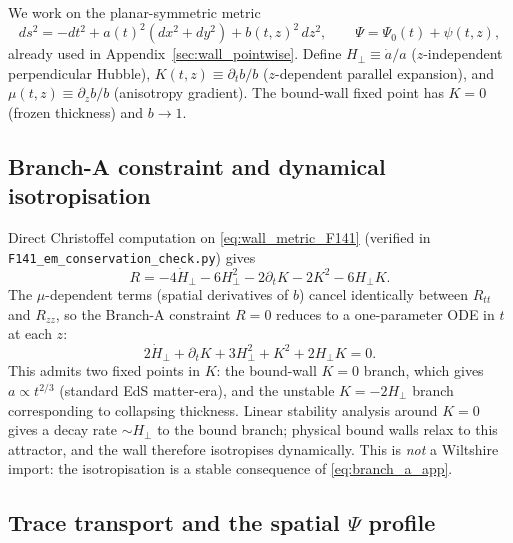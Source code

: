 \documentclass[aps,prd,twocolumn,nofootinbib,floatfix,superscriptaddress]{revtex4-2}
\begin{document}
We work on the planar-symmetric metric
\begin{equation}
\label{eq:wall_metric_F141}
ds^2 = -dt^2 + a(t)^2(dx^2 + dy^2) + b(t,z)^2\,dz^2,
\qquad \Psi = \Psi_0(t) + \psi(t,z),
\end{equation}
already used in Appendix~\ref{sec:wall_pointwise}. Define
$H_\perp \equiv \dot a/a$ ($z$-independent perpendicular Hubble),
$K(t,z) \equiv \partial_t b/b$ ($z$-dependent parallel expansion),
and $\mu(t,z) \equiv \partial_z b/b$ (anisotropy gradient). The
bound-wall fixed point has $K = 0$ (frozen thickness) and
$b \to 1$.

\subsection{Branch-A constraint and dynamical isotropisation}

Direct Christoffel computation on \eqref{eq:wall_metric_F141}
(verified in \texttt{F141\_em\_conservation\_check.py}) gives
\begin{equation}
\label{eq:R_aniso_app}
R = -4\dot H_\perp - 6 H_\perp^2 - 2\partial_t K - 2 K^2 - 6 H_\perp K.
\end{equation}
The $\mu$-dependent terms (spatial derivatives of $b$) cancel
identically between $R_{tt}$ and $R_{zz}$, so the Branch-A constraint
$R = 0$ reduces to a one-parameter ODE in $t$ at each $z$:
\begin{equation}
\label{eq:branch_a_app}
2\dot H_\perp + \partial_t K + 3 H_\perp^2 + K^2 + 2 H_\perp K = 0.
\end{equation}
This admits two fixed points in $K$: the bound-wall $K = 0$ branch,
which gives $a \propto t^{2/3}$ (standard EdS matter-era), and the
unstable $K = -2 H_\perp$ branch corresponding to collapsing thickness.
Linear stability analysis around $K = 0$ gives a decay rate
$\sim H_\perp$ to the bound branch; physical bound walls relax to
this attractor, and the wall therefore isotropises dynamically. This
is \emph{not} a Wiltshire import: the isotropisation is a stable
consequence of \eqref{eq:branch_a_app}.

\subsection{Trace transport and the spatial $\Psi$ profile}
\end{document}
